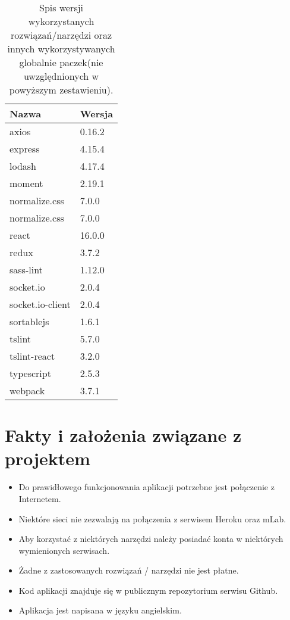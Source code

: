 \documentclass[eng,printmode]{mgr}
\begin{document}
\begin{table}[H]
\begin{tabularx}{\textwidth}{|X|X|}
   \hline
    \textbf{Nazwa} & \textbf{Wersja} \\
   \hline
      axios & 0.16.2 \\
   \hline
     express & 4.15.4 \\
   \hline
  	  lodash & 4.17.4 \\
   \hline
   	  moment & 2.19.1 \\
   \hline
   	 normalize.css & 7.0.0 \\
   \hline
   	 normalize.css & 7.0.0 \\
   \hline
   	 react & 16.0.0 \\
   \hline
   	 redux & 3.7.2 \\
   \hline
   	 sass-lint & 1.12.0 \\
   \hline
   	 socket.io & 2.0.4 \\
   \hline
   	  socket.io-client  & 2.0.4 \\
   \hline
      sortablejs & 1.6.1 \\
   \hline
     tslint & 5.7.0 \\
   \hline
      tslint-react & 3.2.0 \\
   \hline
      typescript & 2.5.3 \\
   \hline
     webpack & 3.7.1 \\
   \hline
\end{tabularx}
\caption{Spis wersji wykorzystanych rozwiązań/narzędzi oraz innych wykorzystywanych globalnie paczek(nie uwzględnionych w powyższym zestawieniu).}
\end{table}

\chapter{Fakty i założenia związane z projektem }
\begin{itemize}
  \item Do prawidłowego funkcjonowania aplikacji potrzebne jest połączenie z Internetem.
  \item Niektóre sieci nie zezwalają na połączenia z serwisem Heroku oraz mLab.
  \item Aby korzystać z niektórych narzędzi należy posiadać konta w niektórych wymienionych serwisach.
  \item Żadne z zastosowanych rozwiązań / narzędzi nie jest płatne.
  \item Kod aplikacji znajduje się w publicznym repozytorium serwisu Github.
  \item Aplikacja jest napisana w języku angielskim.
\end{itemize}
\end{document}
